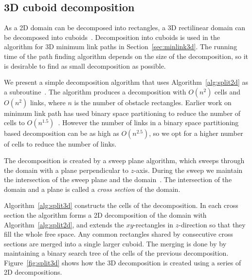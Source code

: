 \documentclass[english,gradu]{tktltiki2018}
\begin{document}
\subsection{3D cuboid decomposition}\label{sec:split3d}

As a 2D domain can be decomposed into rectangles, a 3D rectilinear domain can be decomposed into cuboids~\cite{restricted,wagner}.
Decomposition into cuboids is used in the algorithm for 3D minimum link paths in Section~\ref{sec:minlink3d}.
The running time of the path finding algorithm depends on the size of the decomposition, so it is desirable to find as small decomposition as possible.

We present a simple decomposition algorithm that uses Algorithm~\ref{alg:split2d} as a subroutine~\cite{restricted}.
The algorithm produces a decomposition with $O(n^2)$ cells and $O(n^2)$ links, where $n$ is the number of obstacle rectangles.
Earlier work on minimum link path has used binary space partitioning to reduce the number of cells to $O(n^{1.5})$~\cite{bsp,wagner}.
However the number of links in a binary space partitioning based decomposition can be as high as $O(n^{2.5})$, so we opt for a higher number of cells to reduce the number of links.

The decomposition is created by a sweep plane algorithm, which sweeps through the domain with a plane perpendicular to $z$-axis.
During the sweep we maintain the intersection of the sweep plane and the domain~\fspace.
The intersection of the domain and a plane is called a \emph{cross section} of the domain.

Algorithm~\ref{alg:split3d} constructs the cells of the decomposition.
In each cross section the algorithm forms a 2D decomposition of the domain with Algorithm~\ref{alg:split2d}, and extends the $xy$-rectangles in $z$-direction so that they fill the whole free space.
Any common rectangles shared by consecutive cross sections are merged into a single larger cuboid.
The merging is done by by maintaining a binary search tree of the cells of the previous decomposition.
Figure~\ref{fig:split3d} shows how the 3D decomposition is created using a series of 2D decompositions.
\end{document}
